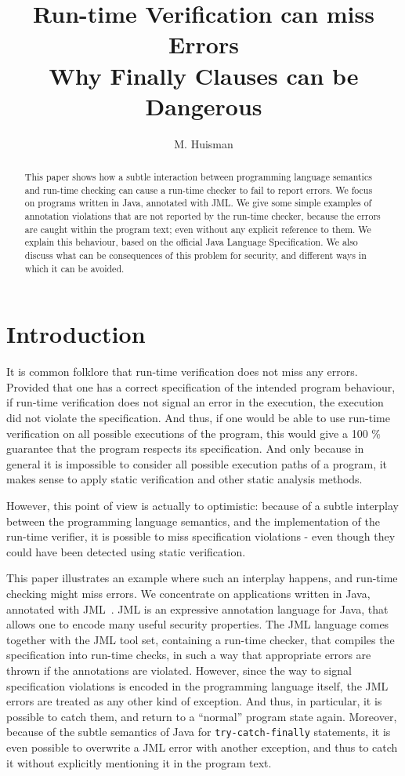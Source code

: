 \documentclass[]{llncs}
\title{Run-time Verification can miss Errors\\{\large Why Finally
Clauses can be Dangerous}}
\author{M. Huisman}
\institute{INRIA Sophia Antipolis-Mediterran\'ee, France}
\begin{document}
\maketitle

\begin{abstract}
This paper shows how a subtle interaction between programming language
semantics and run-time checking can cause a run-time checker to fail
to report errors. We focus on programs written in Java, annotated with
JML. We give some simple examples of annotation violations that are
not reported by the run-time checker, because the errors are caught
within the program text; even without any explicit reference to
them. We explain this behaviour, based on the official Java Language
Specification. We also discuss what can be consequences of this problem
for security, and different ways in which it can be avoided.

\end{abstract}

\section{Introduction}

It is common folklore that run-time verification does not miss any
errors. Provided that one has a correct specification of the intended
program behaviour, if run-time verification does not signal an error in
the execution, the execution did not violate the specification. And
thus, if one would be able to use run-time verification on all possible
executions of  the program, this would give a 100 \% guarantee that
the program respects its specification. And only because in general it is
impossible to consider all possible execution paths of a program, it
makes sense to apply static verification and other static analysis
methods.

However, this point of view is actually to optimistic: because of a
subtle interplay between the programming language semantics, and the
implementation of the run-time verifier, it is possible to miss
specification violations - even though they could have been detected
using static verification.

This paper illustrates an example where such an interplay happens, and
run-time checking might miss errors. We concentrate on applications
written in Java, annotated with JML~\cite{LeavensBR99}. JML is an
expressive annotation language for Java, that allows one to encode
many useful security properties. The JML language comes together with
the JML tool set, containing a run-time checker, that compiles the
specification into run-time checks, in such a way that appropriate
errors are thrown if the annotations are violated. However, since the
way to signal specification violations is encoded in the programming
language itself, the JML errors are treated as any other kind of
exception. And thus, in particular, it is possible to catch them, and
return to a ``normal'' program state again. Moreover, because of the
subtle semantics of Java for
\texttt{try-catch-finally} statements, it is even possible to
overwrite a JML error with another exception, and thus to catch it
without explicitly mentioning it in the program text.
\end{document}
